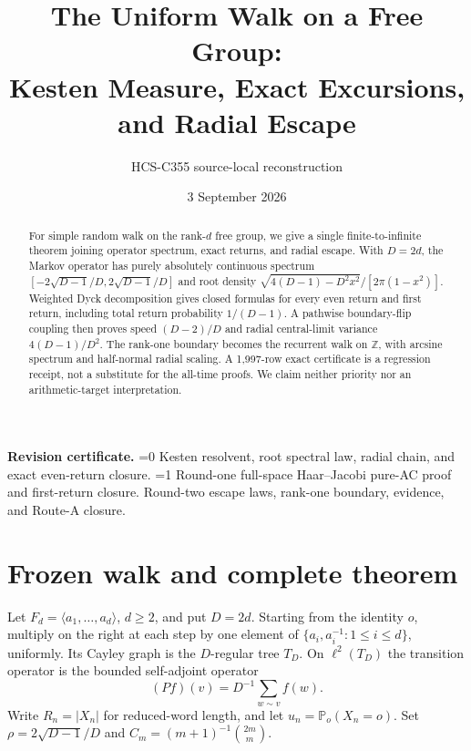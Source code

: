 \documentclass[10pt]{article}
\title{The Uniform Walk on a Free Group:\\
Kesten Measure, Exact Excursions, and Radial Escape}
\author{HCS-C355 source-local reconstruction}
\date{3 September 2026}
\providecommand{\CRevisionRound}{2}
\theoremstyle{remark}
\newcommand{\Pp}{\mathbb P}
\newcommand{\1}{\mathsf{1}}
\begin{document}
\maketitle

\begin{abstract}
For simple random walk on the rank-$d$ free group, we give a single
finite-to-infinite theorem joining operator spectrum, exact returns, and
radial escape.  With $D=2d$, the Markov operator has purely absolutely
continuous spectrum $[-2\sqrt{D-1}/D,2\sqrt{D-1}/D]$ and root density
$\sqrt{4(D-1)-D^2x^2}/[2\pi(1-x^2)]$.  Weighted Dyck decomposition gives
closed formulas for every even return and first return, including total
return probability $1/(D-1)$.  A pathwise boundary-flip coupling then proves
speed $(D-2)/D$ and radial central-limit variance $4(D-1)/D^2$.  The
rank-one boundary becomes the recurrent walk on $\mathbb Z$, with arcsine
spectrum and half-normal radial scaling.  A 1,997-row exact certificate is a
regression receipt, not a substitute for the all-time proofs.  We claim
neither priority nor an arithmetic-target interpretation.
\end{abstract}

\noindent\textbf{Revision certificate.}
\ifnum\CRevisionRound=0
Kesten resolvent, root spectral law, radial chain, and exact even-return closure.
\else\ifnum\CRevisionRound=1
Round-one full-space Haar--Jacobi pure-AC proof and first-return closure.
\else
Round-two escape laws, rank-one boundary, evidence, and Route-A closure.
\fi\fi
\small

\section{Frozen walk and complete theorem}

Let $F_d=\langle a_1,\ldots,a_d\rangle$, $d\ge2$, and put $D=2d$.
Starting from the identity $o$, multiply on the right at each step by one
element of $\{a_i,a_i^{-1}:1\le i\le d\}$, uniformly.  Its Cayley graph is
the $D$-regular tree $T_D$.  On $\ell^2(T_D)$ the transition operator is
the bounded self-adjoint operator
\[
 (Pf)(v)=D^{-1}\sum_{w\sim v}f(w).
\]
Write $R_n=|X_n|$ for reduced-word length, and let $u_n=\Pp_o(X_n=o)$.
Set $\rho=2\sqrt{D-1}/D$ and $C_m=(m+1)^{-1}\binom{2m}{m}$.
\end{document}
